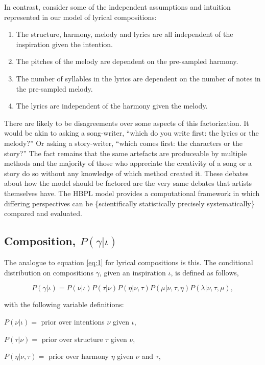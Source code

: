 \documentclass[letterpaper]{article}
\begin{document}
In contrast, consider some of the independent assumptions and intuition represented in our model of lyrical compositions:

\begin{enumerate}  
\item The structure, harmony, melody and lyrics are all independent of the inspiration given the intention.
\item The pitches of the melody are dependent on the pre-sampled harmony.
\item The number of syllables in the lyrics are dependent on the number of notes in the pre-sampled melody.
\item The lyrics are independent of the harmony given the melody.
\end{enumerate}

There are likely to be disagreements over some aspects of this factorization. It would be akin to asking a song-writer, ``which do you write first: the lyrics or the melody?'' Or asking a story-writer, ``which comes first: the characters or the story?'' The fact remains that the same artefacts are produceable by multiple methods and the majority of those who appreciate the creativity of a song or a story do so without any knowledge of which method created it. These debates about how the model should be factored are the very same debates that artists themselves have. The HBPL model provides a computational framework in which differing perspectives can be \{scientifically statistically precisely systematically\} compared and evaluated.

\subsection{Composition, $P(\gamma|\iota)$}

The analogue to equation \ref{eq:1} for lyrical compositions is this. 
The conditional distribution on compositions $\gamma$, given an inspiration $\iota$, is defined as follows,

\[ P(\gamma|\iota) = P(\nu|\iota)P(\tau|\nu)P(\eta|\nu,\tau)P(\mu|\nu,\tau,\eta)P(\lambda|\nu,\tau,\mu), \] 

\noindent with the following variable definitions:

\(P(\nu|\iota)=\) prior over intentions $\nu$ given $\iota$,

\(P(\tau|\nu)=\) prior over structure $\tau$ given $\nu$,

\(P(\eta|\nu,\tau)=\) prior over harmony $\eta$ given $\nu$ and $\tau$,
\end{document}
